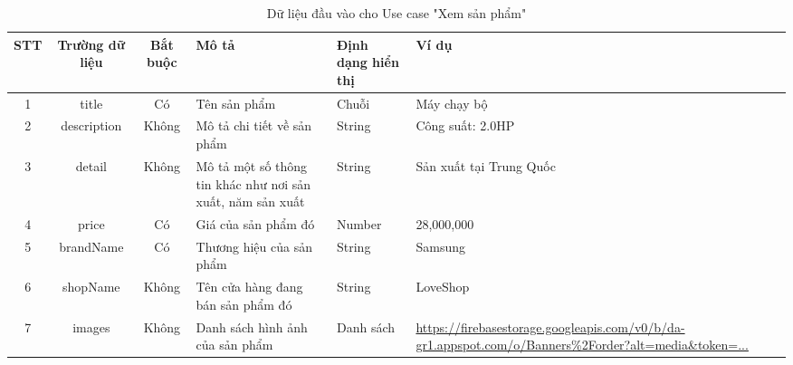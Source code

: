 \documentclass[../DoAn.tex]{subfiles}
\begin{document}
\begin{table}[h!]
\centering
\begin{tabular}{|c|c|c|p{3.5cm}|p{1.5cm}|p{4cm}|}
\hline
\textbf{STT} & \textbf{Trường dữ liệu} & \textbf{Bắt buộc} & \textbf{Mô tả} & \textbf{Định dạng hiển thị} & \textbf{Ví dụ} \\ \hline
1 & title & Có & Tên sản phẩm & Chuỗi & Máy chạy bộ \\ \hline
2 & description & Không & Mô tả chi tiết về sản phẩm & String & Công suất: 2.0HP \\ \hline
3 & detail & Không & Mô tả một số thông tin khác như nơi sản xuất, năm sản xuất & String & Sản xuất tại Trung Quốc \\ \hline
4 & price & Có & Giá của sản phẩm đó & Number & 28,000,000 \\ \hline
5 & brandName & Có & Thương hiệu của sản phẩm & String & Samsung \\ \hline
6 & shopName & Không & Tên cửa hàng đang bán sản phẩm đó & String & LoveShop \\ \hline
7 & images & Không & Danh sách hình ảnh của sản phẩm & Danh sách & \url{https://firebasestorage.googleapis.com/v0/b/da-gr1.appspot.com/o/Banners%2Forder?alt=media&token=...} \\ \hline
\end{tabular}
\caption{Dữ liệu đầu vào cho Use case "Xem sản phẩm"}
\label{tab:viewProductInput}
\end{table}
















\FloatBarrier
\end{document}
